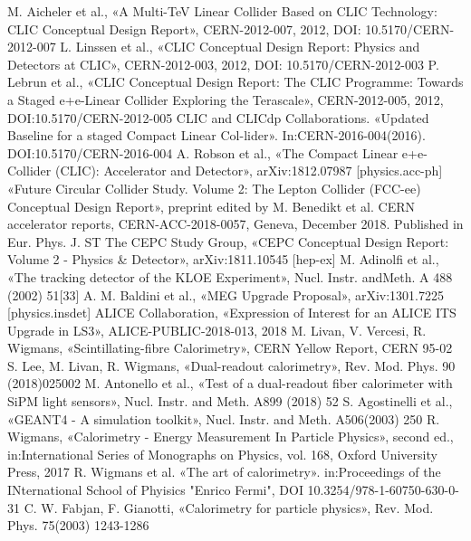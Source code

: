 \documentclass[a4paper,11pt,titlepage,oneside,openright]{book}	%
\begin{document}
\begin{backmatter}
\begin{thebibliography}{99}
			 M. Aicheler et al., «A Multi-TeV Linear Collider Based on CLIC Technology:  CLIC Conceptual Design Report», CERN-2012-007, 2012,   DOI: 10.5170/CERN-2012-007
			 L. Linssen et al., «CLIC Conceptual Design Report:  Physics and Detectors at CLIC», CERN-2012-003, 2012,   DOI: 10.5170/CERN-2012-003
			 P. Lebrun et al., «CLIC Conceptual Design Report:  The CLIC Programme:  Towards a Staged e+e-Linear Collider Exploring the Terascale», CERN-2012-005, 2012,   DOI:10.5170/CERN-2012-005
			 CLIC and CLICdp Collaborations. «Updated Baseline for a staged Compact Linear Col-lider». In:CERN-2016-004(2016).  DOI:10.5170/CERN-2016-004
			 A. Robson et al., «The  Compact  Linear  e+e-Collider  (CLIC):  Accelerator  and  Detector», arXiv:1812.07987 [physics.acc-ph]
		     «Future Circular Collider Study. Volume 2: The Lepton Collider (FCC-ee) Conceptual Design  Report»,  preprint  edited  by  M.  Benedikt  et  al.  CERN  accelerator  reports, CERN-ACC-2018-0057, Geneva, December 2018. Published in Eur. Phys. J. ST
		     The CEPC Study Group, «CEPC Conceptual Design Report: Volume 2 - Physics \& Detector», arXiv:1811.10545 [hep-ex]
		     M. Adinolfi et al., «The tracking detector of the KLOE  Experiment», Nucl. Instr. andMeth. A 488 (2002) 51[33]
		     A. M. Baldini et al., «MEG Upgrade Proposal», arXiv:1301.7225 [physics.insdet]
		     ALICE  Collaboration, «Expression  of  Interest  for  an  ALICE  ITS  Upgrade  in  LS3», ALICE-PUBLIC-2018-013, 2018
		     M. Livan,  V. Vercesi,  R. Wigmans, «Scintillating-fibre  Calorimetry»,  CERN  Yellow Report, CERN 95-02
		     S. Lee, M. Livan, R. Wigmans, «Dual-readout calorimetry», Rev. Mod. Phys. 90 (2018)025002
		      M. Antonello et al., «Test of a dual-readout fiber calorimeter with SiPM light sensors», Nucl. Instr. and Meth. A899 (2018) 52
		      S. Agostinelli et al., «GEANT4 - A simulation  toolkit», Nucl. Instr. and Meth. A506(2003) 250
			  R. Wigmans, «Calorimetry - Energy Measurement In Particle Physics», second ed., in:International  Series  of  Monographs  on  Physics,  vol.  168,  Oxford  University  Press, 2017
			 R. Wigmans et al. «The art of calorimetry». in:Proceedings of the INternational School of Phyisics "Enrico Fermi",   DOI 10.3254/978-1-60750-630-0-31
			  C.  W.  Fabjan,  F.  Gianotti, «Calorimetry  for  particle  physics»,  Rev.  Mod.  Phys.  75(2003) 1243-1286

\end{thebibliography}
\end{backmatter}
\end{document}
